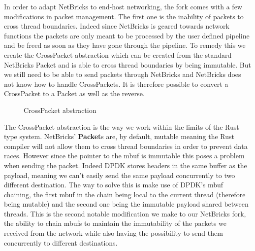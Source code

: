 In order to adapt NetBricks to end-host networking, the fork comes
with a few modifications in packet management. The first one is the
inability of packets to cross thread boundaries. Indeed since
NetBricks is geared towards network functions the packets are only
meant to be processed by the user defined pipeline and be freed as
soon as they have gone through the pipeline. To remedy this we create
the CrossPacket abstraction which can be created from the standard
NetBricks Packet and is able to cross thread boundaries by being
immutable. But we still need to be able to send packets through
NetBricks and NetBricks does not know how to handle CrossPackets. It
is therefore possible to convert a CrossPacket to a Packet as well as
the reverse.

\begin{figure}[htb!]
  
  \caption{CrossPacket abstraction}
  \label{code:crosspacket}
\end{figure}

The CrossPacket abstraction is the way we work within the limits of
the Rust type system. NetBricks' \textbf{Packet}s are, by default,
mutable meaning the Rust compiler will not allow them to cross thread
boundaries in order to prevent data races. However since the
pointer to the mbuf is immutable this poses a problem when sending the
packet. Indeed DPDK stores headers in the same buffer as the payload,
meaning we can't easily send the same payload concurrently to two
different destination. The way to solve this is make use of DPDK's
mbuf chaining, the first mbuf in the chain being local to the current
thread (therefore being mutable) and the second one being the
immutable payload shared between threads. This is the second notable
modification we make to our NetBricks fork, the ability to chain mbufs
to maintain the immutability of the packets we received from the
network while also having the possibility to send them concurrently to
different destinations.

